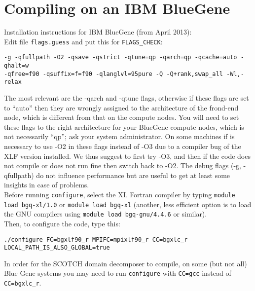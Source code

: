 \section{Compiling on an IBM BlueGene}

\noindent
Installation instructions for IBM BlueGene (from April 2013):\\


\noindent Edit file \texttt{flags.guess} and put this for \texttt{FLAGS\_CHECK}:
\begin{verbatim}
-g -qfullpath -O2 -qsave -qstrict -qtune=qp -qarch=qp -qcache=auto -qhalt=w
-qfree=f90 -qsuffix=f=f90 -qlanglvl=95pure -Q -Q+rank,swap_all -Wl,-relax
\end{verbatim}

\noindent The most relevant are the -qarch and -qtune flags, otherwise
if these flags are set to ``auto'' then they are wrongly assigned
to the architecture of the frond-end node, which is different from
that on the compute nodes. You will need to set these flags to the
right architecture for your BlueGene compute nodes, which is not necessarily
``qp''; ask your system administrator. On some machines if is necessary
to use -O2 in these flags instead of -O3 due to a compiler bug of
the XLF version installed. We thus suggest to first try -O3, and then
if the code does not compile or does not run fine then switch back
to -O2. The debug flags (-g, -qfullpath) do not influence performance
but are useful to get at least some insights in case of problems.\\


\noindent Before running \texttt{configure}, select the XL Fortran
compiler by typing \texttt{module load bgq-xl/1.0} or \texttt{module
load bgq-xl} (another, less efficient option is to load the GNU compilers
using \texttt{module load bgq-gnu/4.4.6} or similar).\\


\noindent Then, to configure the code, type this:
\begin{verbatim}
./configure FC=bgxlf90_r MPIFC=mpixlf90_r CC=bgxlc_r LOCAL_PATH_IS_ALSO_GLOBAL=true
\end{verbatim}

In order for the SCOTCH domain decomposer to compile, on some (but
not all) Blue Gene systems you may need to run \texttt{configure}
with \texttt{CC=gcc} instead of \texttt{CC=bgxlc\_r}.

